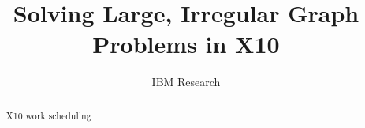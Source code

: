 \documentclass{ieee}
\numberwithin{equation}{section}
\begin{document}
\title{Solving Large, Irregular Graph Problems in X10}

\author{IBM Research}

\maketitle
\thispagestyle{empty}

\begin{abstract}
X10 work scheduling
\end{abstract}







\end{document}
